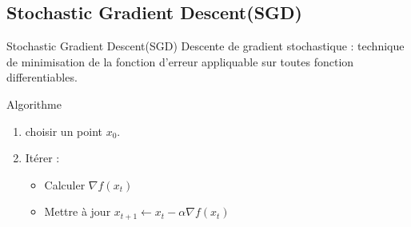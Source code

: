\documentclass{beamer}
\begin{document}
\subsection{Stochastic Gradient Descent(SGD)}
  \begin{frame}{Stochastic Gradient Descent(SGD)}
Descente de gradient stochastique : technique de minimisation de la fonction d'erreur {\tiny appliquable sur toutes fonction differentiables}.\newline

\begin{block}{Algorithme}
\begin{enumerate}
	\item{choisir un point $x_0$.}
	\item{Itérer : 
\begin{itemize}
	\item{Calculer $\nabla f(x_t)$ }
	\item{Mettre à jour $x_{t+1}\leftarrow x_t - \alpha \nabla f(x_t)$}
\end{itemize}
	}
\end{enumerate}
\end{block}
\end{frame}
\end{document}
